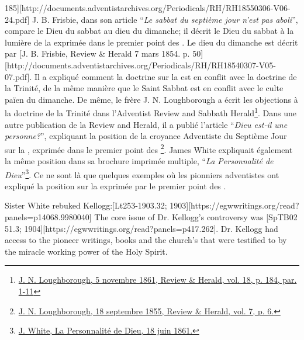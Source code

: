 185][http://documents.adventistarchives.org/Periodicals/RH/RH18550306-V06-24.pdf] J. B. Frisbie, dans son article “\textit{Le sabbat du septième jour n'est pas aboli}”, compare le Dieu du sabbat au dieu du dimanche; il décrit le Dieu du sabbat à la lumière de la  exprimée dans le premier point des . Le dieu du dimanche est décrit par [J. B. Frisbie, Review \& Herald 7 mars 1854. p. 50][http://documents.adventistarchives.org/Periodicals/RH/RH18540307-V05-07.pdf]. Il a expliqué comment la doctrine sur la  est en conflit avec la doctrine de la Trinité, de la même manière que le Saint Sabbat est en conflit avec le culte païen du dimanche. De même, le frère J. N. Loughborough a écrit les objections à la doctrine de la Trinité dans l'Adventist Review and Sabbath Herald\footnote{\href{https://adventistdigitallibrary.org/adl-349160/advent-review-and-sabbath-herald-november-5-1861}{J. N. Loughborough, 5 novembre 1861, Review \& Herald, vol. 18, p. 184, par. 1-11}}. Dans une autre publication de la Review and Herald, il a publié l'article “\textit{Dieu est-il une personne?}”, expliquant la position de la croyance Adventiste du Septième Jour sur la , exprimée dans le premier point des \footnote{\href{http://documents.adventistarchives.org/Periodicals/RH/RH18550918-V07-06.pdf}{J. N. Loughborough, 18 septembre 1855, Review \& Herald, vol. 7, p. 6.}}. James White expliquait également la même position dans sa brochure imprimée multiple, “\textit{La Personnalité de Dieu}”\footnote{\href{https://egwwritings.org/?ref=en_PERGO.1.1&para=1471.3}{J. White, La Personnalité de Dieu, 18 juin 1861.}}. Ce ne sont là que quelques exemples où les pionniers adventistes ont expliqué la position sur la  exprimée par le premier point des .


Sister White rebuked Kellogg:[Lt253-1903.32; 1903][https://egwwritings.org/read?panels=p14068.9980040] The core issue of Dr. Kellogg’s controversy was [SpTB02 51.3; 1904][https://egwwritings.org/read?panels=p417.262]. Dr. Kellogg had access to the pioneer writings, books and the church's  that were testified to by the miracle working power of the Holy Spirit.



